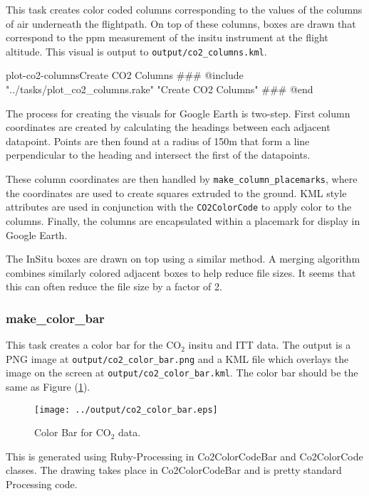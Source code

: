 \documentclass[12pt]{article}
\begin{document}
This task creates color coded columns corresponding to the values of the columns of air underneath the flightpath.  On top of these columns, boxes are drawn that correspond to the ppm measurement of the insitu instrument at the flight altitude.  This visual is output to \texttt{output/co2\_columns.kml}.

\begin{code}{plot-co2-columns}{Create CO2 Columns}
### @include "../tasks/plot_co2_columns.rake" "Create CO2 Columns"
### @end
\end{code}

The process for creating the visuals for Google Earth is two-step.  First column coordinates are created by calculating the headings between each adjacent datapoint.  Points are then found at a radius of 150m that form a line perpendicular to the heading and intersect the first of the datapoints.

These column coordinates are then handled by \texttt{make\_column\_placemarks}, where the coordinates are used to create squares extruded to the ground.  KML style attributes are used in conjunction with the \texttt{CO2ColorCode} to apply color to the columns. Finally, the columns are encapsulated within a placemark for display in Google Earth.  

The InSitu boxes are drawn on top using a similar method.  A merging algorithm combines similarly colored adjacent boxes to help reduce file sizes.  It seems that this can often reduce the file size by a factor of 2.

\subsubsection*{make\_color\_bar}

This task creates a color bar for the CO$_2$ insitu and ITT data.  The output is a PNG image at \texttt{output/co2\_color\_bar.png} and a KML file which overlays the image on the screen at \texttt{output/co2\_color\_bar.kml}.  The color bar should be the same as Figure (\ref{co2-color-bar}).   

\begin{figure}
\centering
\texttt{[image: ../output/co2\_color\_bar.eps]}
\caption{Color Bar for CO$_2$ data.}
\label{co2-color-bar}
\end{figure}

This is generated using Ruby-Processing in Co2ColorCodeBar and Co2ColorCode classes.  The drawing takes place in Co2ColorCodeBar and is pretty standard Processing code.  
\end{document}
